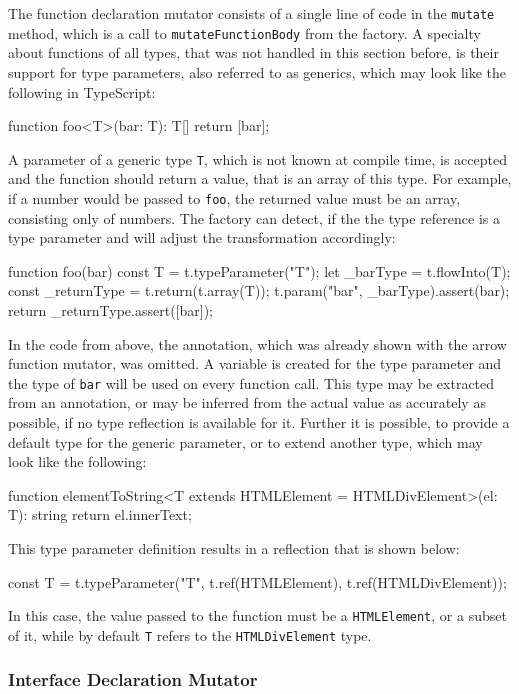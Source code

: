 The function declaration mutator consists of a single line of code in the \texttt{mutate} method, which is a call to \texttt{mutateFunctionBody} from the factory. A specialty about functions of all types, that was not handled in this section before, is their support for type parameters, also referred to as generics, which may look like the following in TypeScript:
\begin{JsCode}[numbers=none]
function foo<T>(bar: T): T[] {
  return [bar];
}
\end{JsCode}
A parameter of a generic type \texttt{T}, which is not known at compile time, is accepted and the function should return a value, that is an array of this type. For example, if a number would be passed to \texttt{foo}, the returned value must be an array, consisting only of numbers. The factory can detect, if the the type reference is a type parameter and will adjust the transformation accordingly:
\begin{JsCode}[numbers=none]
function foo(bar) {
    const T = t.typeParameter("T");
    let _barType = t.flowInto(T);
    const _returnType = t.return(t.array(T));
    t.param("bar", _barType).assert(bar);
    return _returnType.assert([bar]);
}
\end{JsCode}
In the code from above, the annotation, which was already shown with the arrow function mutator, was omitted. A variable is created for the type parameter and the type of \texttt{bar} will be used on every function call. This type may be extracted from an annotation, or may be inferred from the actual value as accurately as possible, if no type reflection is available for it. Further it is possible, to provide a default type for the generic parameter, or to extend another type, which may look like the following:
\begin{JsCode}[numbers=none]
function elementToString<T extends HTMLElement = HTMLDivElement>(el: T): string {
  return el.innerText;
}
\end{JsCode}
This type parameter definition results in a reflection that is shown below:
\begin{JsCode}[numbers=none]
const T = t.typeParameter("T", t.ref(HTMLElement), t.ref(HTMLDivElement));
\end{JsCode}
In this case, the value passed to the function must be a \texttt{HTMLElement}, or a subset of it, while by default \texttt{T} refers to the \texttt{HTMLDivElement} type.

\subsubsection{Interface Declaration Mutator}

